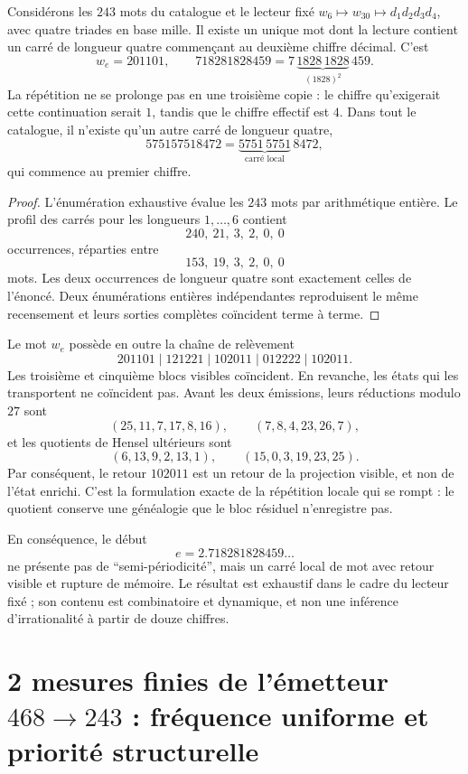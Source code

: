 \begin{theorem}
\label{thm:cuadrado-local-e}
Considérons les \(243\) mots du catalogue et le lecteur fixé
\(w_6\mapsto w_{30}\mapsto d_1d_2d_3d_4\), avec quatre triades en base mille.
Il existe un unique mot dont la lecture contient un carré de longueur quatre
commençant au deuxième chiffre décimal. C'est
\[
 w_e=201101,
 \qquad
 718281828459=7\,\underbrace{1828\,1828}_{(1828)^2}\,459.
\]
La répétition ne se prolonge pas en une troisième copie : le chiffre qu'exigerait cette
continuation serait \(1\), tandis que le chiffre effectif est \(4\). Dans tout le
catalogue, il n'existe qu'un autre carré de longueur quatre,
\[
 575157518472=\underbrace{5751\,5751}_{\text{carré local}}\,8472,
\]
qui commence au premier chiffre.
\end{theorem}

\begin{proof}
L'énumération exhaustive évalue les \(243\) mots par arithmétique
entière. Le profil des carrés pour les longueurs \(1,\ldots,6\) contient
\[
 240,\ 21,\ 3,\ 2,\ 0,\ 0
\]
occurrences, réparties entre
\[
 153,\ 19,\ 3,\ 2,\ 0,\ 0
\]
mots. Les deux occurrences de longueur quatre sont exactement celles de
l'énoncé. Deux énumérations entières indépendantes reproduisent le même recensement
et leurs sorties complètes coïncident terme à terme.
\end{proof}

Le mot \(w_e\) possède en outre la chaîne de relèvement
\[
201101\mid121221\mid102011\mid012222\mid102011.
\]
Les troisième et cinquième blocs visibles coïncident. En revanche,
les états qui les transportent ne coïncident pas. Avant les deux émissions, leurs réductions
modulo \(27\) sont
\[
(25,11,7,17,8,16),
\qquad
(7,8,4,23,26,7),
\]
et les quotients de Hensel ultérieurs sont
\[
(6,13,9,2,13,1),
\qquad
(15,0,3,19,23,25).
\]
Par conséquent, le retour \(102011\) est un retour de la projection visible, et non
de l'état enrichi. C'est la formulation exacte de la répétition locale
qui se rompt : le quotient conserve une généalogie que le bloc résiduel
n'enregistre pas.

En conséquence, le début
\[
e=2.718281828459\ldots
\]
ne présente pas de ``semi-périodicité'', mais un carré local de mot avec
retour visible et rupture de mémoire. Le résultat est exhaustif dans le cadre du
lecteur fixé ; son contenu est combinatoire et dynamique, et non une inférence
d'irrationalité à partir de douze chiffres.

\section[2 mesures finies de l'émetteur 468 à 243]{2 mesures finies de l'émetteur \texorpdfstring{\(468\to243\)}{468→243} : fréquence uniforme et priorité structurelle}

